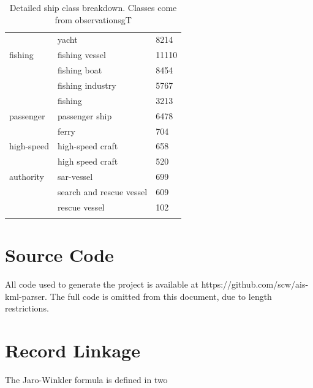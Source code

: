 \begin{longtable}{l|l|l}
           & yacht & 8214 \\
  fishing & fishing vessel & 11110 \\
          & fishing boat & 8454 \\
          & fishing industry & 5767 \\
          & fishing & 3213 \\
  passenger & passenger ship & 6478 \\
            & ferry & 704 \\
  high-speed & high-speed craft & 658 \\
             & high speed craft & 520 \\
  authority & sar-vessel & 699 \\
            & search and rescue vessel & 609 \\
            & rescue vessel & 102 \\
  \caption{Detailed ship class breakdown. Classes come from observationsgT}
  \label{table:ship-class-breakdown}
\end{longtable}

\newpage
\section{Source Code}
\label{sec:source-code}


All code used to generate the project is available at https://github.com/scw/ais-kml-parser. The full code is omitted from this document, due to length restrictions.



\section{Record Linkage}
\label{sec:record-linkage-appendix}

The Jaro-Winkler formula is defined in two 


